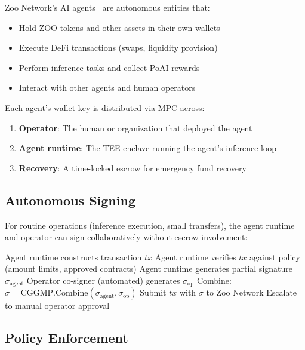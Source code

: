 \documentclass[11pt,letterpaper]{article}
\begin{document}
Zoo Network's AI agents~\cite{zoo-agent-nft} are autonomous entities that:

\begin{itemize}
    \item Hold ZOO tokens and other assets in their own wallets
    \item Execute DeFi transactions (swaps, liquidity provision)
    \item Perform inference tasks and collect PoAI rewards
    \item Interact with other agents and human operators
\end{itemize}

Each agent's wallet key is distributed via MPC across:

\begin{enumerate}
    \item \textbf{Operator}: The human or organization that deployed the agent
    \item \textbf{Agent runtime}: The TEE enclave running the agent's inference loop
    \item \textbf{Recovery}: A time-locked escrow for emergency fund recovery
\end{enumerate}

\subsection{Autonomous Signing}

For routine operations (inference execution, small transfers), the agent runtime and operator can sign collaboratively without escrow involvement:

\begin{algorithm}[t]
\caption{Agent Autonomous Transaction}
\label{alg:agent}
\begin{algorithmic}[1]
\STATE Agent runtime constructs transaction $tx$
\STATE Agent runtime verifies $tx$ against policy (amount limits, approved contracts)
    \STATE Agent runtime generates partial signature $\sigma_{\text{agent}}$
    \STATE Operator co-signer (automated) generates $\sigma_{\text{op}}$
    \STATE Combine: $\sigma = \text{CGGMP.Combine}(\sigma_{\text{agent}}, \sigma_{\text{op}})$
    \STATE Submit $tx$ with $\sigma$ to Zoo Network
\ELSE
    \STATE Escalate to manual operator approval
\ENDIF
\end{algorithmic}
\end{algorithm}

\subsection{Policy Enforcement}
\end{document}
